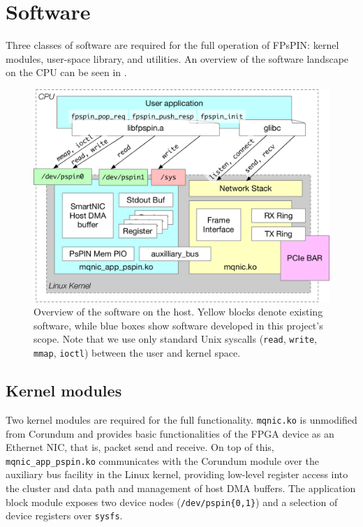 \chapter{Software}

Three classes of software are required for the full operation of FPsPIN: kernel modules, user-space library, and utilities.  An overview of the software landscape on the CPU can be seen in .

\begin{figure}
    \centering
    \includegraphics[width=\linewidth]{figures/sw-overview.pdf}
    \caption{Overview of the software on the host.  Yellow blocks denote existing software, while blue boxes show software developed in this project's scope.  Note that we use only standard Unix syscalls (\texttt{read}, \texttt{write}, \texttt{mmap}, \texttt{ioctl}) between the user and kernel space.}
    \label{fig:sw-overview}
\end{figure}

\section{Kernel modules} \label{sec:sw-kmod}

Two kernel modules are required for the full functionality.  \texttt{mqnic.ko} is unmodified from Corundum and provides basic functionalities of the FPGA device as an Ethernet NIC, that is, packet send and receive.  On top of this, \texttt{mqnic\_app\_pspin.ko} communicates with the Corundum module over the auxiliary bus facility in the Linux kernel, providing low-level register access into the cluster and data path and management of host DMA buffers.  The application block module exposes two device nodes (\texttt{/dev/pspin\{0,1\}}) and a selection of device registers over \texttt{sysfs}.


